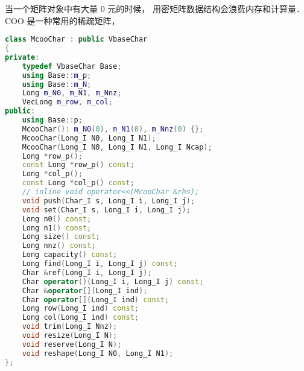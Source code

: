 
\begin{issues}
\issueDraft
\end{issues}


当一个矩阵对象中有大量 0 元的时候， 用密矩阵数据结构会浪费内存和计算量． COO 是一种常用的稀疏矩阵， 

\begin{lstlisting}[language=cpp]
class McooChar : public VbaseChar
{
private:
    typedef VbaseChar Base;
    using Base::m_p;
    using Base::m_N;
    Long m_N0, m_N1, m_Nnz;
    VecLong m_row, m_col;
public:
    using Base::p;
    McooChar(): m_N0(0), m_N1(0), m_Nnz(0) {};
    McooChar(Long_I N0, Long_I N1);
    McooChar(Long_I N0, Long_I N1, Long_I Ncap);
    Long *row_p();
    const Long *row_p() const;
    Long *col_p();
    const Long *col_p() const;
    // inline void operator<<(McooChar &rhs);
    void push(Char_I s, Long_I i, Long_I j);
    void set(Char_I s, Long_I i, Long_I j);
    Long n0() const;
    Long n1() const;
    Long size() const;
    Long nnz() const;
    Long capacity() const;
    Long find(Long_I i, Long_I j) const;
    Char &ref(Long_I i, Long_I j);
    Char operator()(Long_I i, Long_I j) const;
    Char &operator[](Long_I ind);
    Char operator[](Long_I ind) const;
    Long row(Long_I ind) const;
    Long col(Long_I ind) const;
    void trim(Long_I Nnz);
    void resize(Long_I N);
    void reserve(Long_I N);
    void reshape(Long_I N0, Long_I N1);
};
\end{lstlisting}
